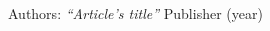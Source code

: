 \newpage
\begin{thebibliography}{99}

 Authors:
\emph{``Article's title''}
 Publisher (year)
\end{thebibliography}
